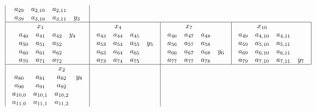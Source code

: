 \begin{figure}[ht]
{\[\begin{array}{| c | c | c | c |}
\begin{array}{c c c c}
a_{29} & a_{2,10} & a_{2,11} & \\
a_{39} & a_{3,10} & a_{3,11} & y_3 \\
\end{array}
\\ \hline
\begin{array}{c c c c}
& x_1\\
a_{40} & a_{41} &a_{42} & y_4\\
a_{50} & a_{51} &a_{52} & \\
a_{60} & a_{61} &a_{62} & \\
a_{70} & a_{71} &a_{72} & \\
\end{array}
&
\begin{array}{c c c c}
& x_4\\
a_{43} & a_{44} &a_{45} & \\
a_{53} & a_{54} &a_{55} & y_5\\
a_{63} & a_{64} &a_{65} & \\
a_{73} & a_{74} &a_{75} & \\
\end{array}
&
\begin{array}{c c c c}
& x_7\\
a_{46} & a_{47} &a_{48} & \\
a_{56} & a_{57} &a_{58} & \\
a_{66} & a_{67} &a_{68} & y_6 \\
a_{77} & a_{77} &a_{78} & \\
\end{array}
&
\begin{array}{c c c c}
& x_{10}\\
a_{49} & a_{4,10} & a_{4,11} & \\
a_{59} & a_{5,10} & a_{5,11} & \\
a_{69} & a_{6,10} & a_{6,11} & \\
a_{79} & a_{7,10} & a_{7,11} & y_7 \\
\end{array}
\\ \hline
\begin{array}{c c c c}
&&x_2\\
a_{80} &  a_{81} &  a_{82} & y_8\\
a_{90} &  a_{91}   &a_{92} & \\
a_{10,0} &a_{10,1} &a_{10,2} & \\
a_{11,0} &a_{11,1} &a_{11,2} & \\
\end{array}
&
\begin{array}{c c c c}

\end{array}
\end{array}\]}
\end{figure}
